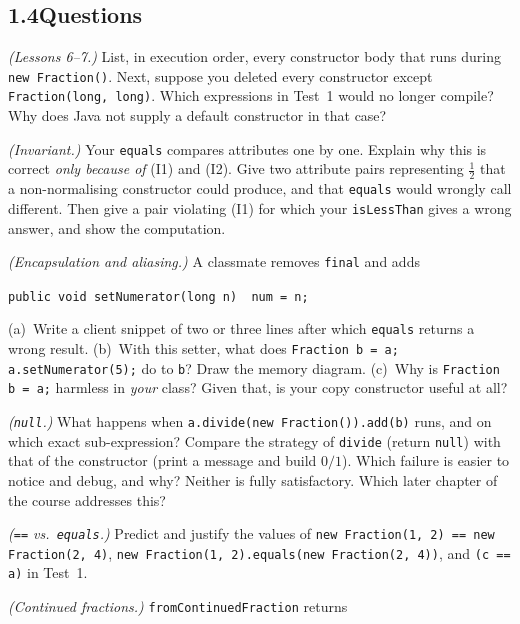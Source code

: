\documentclass[11pt,a4paper]{article}
\newcommand{\code}[1]{\lstinline[basicstyle=\ttfamily\normalsize,basewidth=0.5em]{#1}}
\begin{document}
\subsection*{1.4\quad Questions}
\begin{questions}
  \item \emph{(Lessons 6--7.)} List, in execution order, every constructor
        body that runs during \code{new Fraction()}. Next, suppose you deleted every
        constructor except \code{Fraction(long, long)}. Which expressions in Test~1
        would no longer compile? Why does Java not supply a default constructor
        in that case?
  \item \emph{(Invariant.)} Your \code{equals} compares attributes one by one.
        Explain why this is correct \emph{only because of} (I1) and (I2). Give
        two attribute pairs representing $\tfrac12$ that a non-normalising
        constructor could produce, and that \code{equals} would wrongly call
        different. Then give a pair violating (I1) for which your
        \code{isLessThan} gives a wrong answer, and show the computation.
  \item \emph{(Encapsulation and aliasing.)} A classmate removes \code{final} and adds
        \begin{center}\texttt{public void setNumerator(long n) \ num = n; }\end{center}
        (a)~Write a client snippet of two or three lines after which
        \code{equals} returns a wrong result.
        (b)~With this setter, what does \code{Fraction b = a; a.setNumerator(5);}
        do to \code{b}? Draw the memory diagram.
        (c)~Why is \code{Fraction b = a;} harmless in \emph{your} class? Given
        that, is your copy constructor useful at all?
  \item \emph{(\code{null}.)} What happens when
        \code{a.divide(new Fraction()).add(b)} runs, and on which exact
        sub-expression? Compare the strategy of \code{divide} (return \code{null})
        with that of the constructor (print a message and build $0/1$). Which
        failure is easier to notice and debug, and why? Neither is fully
        satisfactory. Which later chapter of the course addresses this?
  \item \emph{(\code{==} vs.\ \code{equals}.)} Predict and justify the values of
        \code{new Fraction(1, 2) == new Fraction(2, 4)},
        \code{new Fraction(1, 2).equals(new Fraction(2, 4))},
        and \code{(c == a)} in Test~1.
  \item \emph{(Continued fractions.)} \code{fromContinuedFraction} returns

\end{questions}
\end{document}

